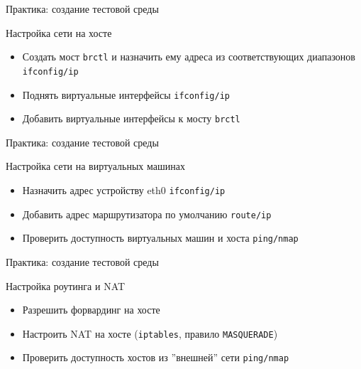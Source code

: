 \begin{frame}{Практика: создание тестовой среды}

	\begin{block}{Настройка сети на хосте}
			\begin{itemize}
				\item Создать мост {\tt brctl} и назначить ему адреса из соответствующих диапазонов {\tt ifconfig/ip}
				\item Поднять виртуальные интерфейсы {\tt ifconfig/ip}
				\item Добавить виртуальные интерфейсы к мосту {\tt brctl}
			\end{itemize}
	\end{block}
\end{frame}


\begin{frame}{Практика: создание тестовой среды}
	\begin{block}{Настройка сети на виртуальных машинах}
			\begin{itemize}
				\item Назначить адрес устройству eth0 {\tt ifconfig/ip}
				\item Добавить адрес маршрутизатора по умолчанию {\tt route/ip}
				\item Проверить доступность виртуальных машин и хоста {\tt ping/nmap}
			\end{itemize}
	\end{block}
\end{frame}

\begin{frame}{Практика: создание тестовой среды}

	\begin{block}{Настройка роутинга и NAT}
			\begin{itemize}
				\item Разрешить форвардинг на хосте
				\item Настроить NAT на хосте ({\tt iptables},  правило {\tt MASQUERADE})
				\item Проверить доступность хостов из ''внешней'' сети {\tt ping/nmap}
			\end{itemize}
	\end{block}
\end{frame}


